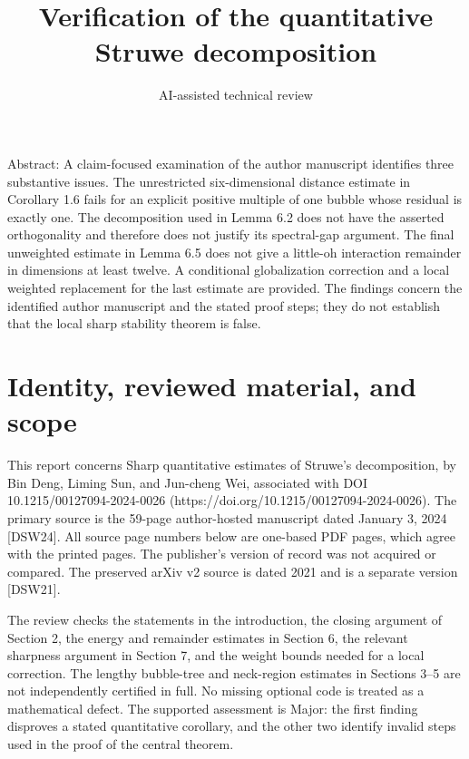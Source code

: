 \documentclass[10pt]{article}
\title{Verification of the quantitative Struwe decomposition}
\author{AI-assisted technical review}
\date{}
\begin{document}
\maketitle
Abstract: A claim-focused examination of the author manuscript identifies three substantive issues. The unrestricted six-dimensional distance estimate in Corollary 1.6 fails for an explicit positive multiple of one bubble whose residual is exactly one. The decomposition used in Lemma 6.2 does not have the asserted orthogonality and therefore does not justify its spectral-gap argument. The final unweighted estimate in Lemma 6.5 does not give a little-oh interaction remainder in dimensions at least twelve. A conditional globalization correction and a local weighted replacement for the last estimate are provided. The findings concern the identified author manuscript and the stated proof steps; they do not establish that the local sharp stability theorem is false.\par
\section*{Identity, reviewed material, and scope}
This report concerns Sharp quantitative estimates of Struwe’s decomposition, by Bin Deng, Liming Sun, and Jun-cheng Wei, associated with DOI 10.1215/00127094-2024-0026 (https://doi.org/10.1215/00127094-2024-0026). The primary source is the 59-page author-hosted manuscript dated January 3, 2024 [DSW24]. All source page numbers below are one-based PDF pages, which agree with the printed pages. The publisher’s version of record was not acquired or compared. The preserved arXiv v2 source is dated 2021 and is a separate version [DSW21].\par
The review checks the statements in the introduction, the closing argument of Section 2, the energy and remainder estimates in Section 6, the relevant sharpness argument in Section 7, and the weight bounds needed for a local correction. The lengthy bubble-tree and neck-region estimates in Sections 3–5 are not independently certified in full. No missing optional code is treated as a mathematical defect. The supported assessment is Major: the first finding disproves a stated quantitative corollary, and the other two identify invalid steps used in the proof of the central theorem.\par
\end{document}
